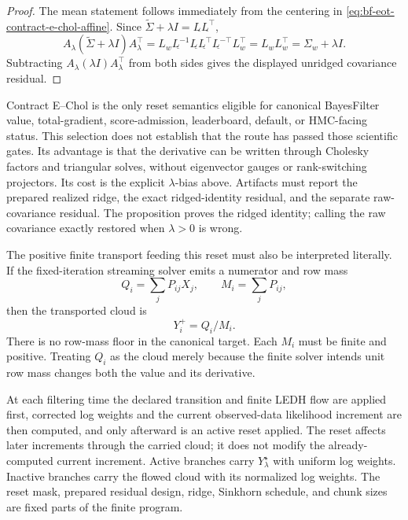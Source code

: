 \begin{proof}
The mean statement follows immediately from the centering in
\eqref{eq:bf-eot-contract-e-chol-affine}.  Since
\(\widetilde\Sigma+\lambda I=L_{\widetilde{}}L_{\widetilde{}}^\top\),
\[
  A_\lambda(\widetilde\Sigma+\lambda I)A_\lambda^\top
  =
  L_wL_{\widetilde{}}^{-1}
  L_{\widetilde{}}L_{\widetilde{}}^\top
  L_{\widetilde{}}^{-\top}L_w^\top
  =
  L_wL_w^\top
  =
  \Sigma_w+\lambda I.
\]
Subtracting
\(A_\lambda(\lambda I)A_\lambda^\top\) from both sides gives the displayed
unridged covariance residual.
\end{proof}

Contract E--Chol is the only reset semantics eligible for canonical BayesFilter
value, total-gradient, score-admission, leaderboard, default, or HMC-facing
status.  This selection does not establish that the route has passed those
scientific gates.  Its advantage is that the derivative can be written through
Cholesky factors and triangular solves, without eigenvector gauges or
rank-switching projectors.  Its cost is the explicit \(\lambda\)-bias above.
Artifacts must report the prepared realized ridge, the exact ridged-identity
residual, and the separate raw-covariance residual.  The proposition proves the
ridged identity; calling the raw covariance exactly restored when
\(\lambda>0\) is wrong.

The positive finite transport feeding this reset must also be interpreted
literally.  If the fixed-iteration streaming solver emits a numerator and row
mass
\[
  Q_i=\sum_j P_{ij}X_j,\qquad M_i=\sum_j P_{ij},
\]
then the transported cloud is
\begin{equation}
\label{eq:bf-eot-contract-e-row-quotient}
  Y_i^+=Q_i/M_i.
\end{equation}
There is no row-mass floor in the canonical target.  Each \(M_i\) must be finite
and positive.  Treating \(Q_i\) as the cloud merely because the finite solver
intends unit row mass changes both the value and its derivative.

At each filtering time the declared transition and finite LEDH flow are applied
first, corrected log weights and the current observed-data likelihood increment
are then computed, and only afterward is an active reset applied.  The reset
affects later increments through the carried cloud; it does not modify the
already-computed current increment.  Active branches carry
\(Y^\star_\lambda\) with uniform log weights.  Inactive branches carry the
flowed cloud with its normalized log weights.  The reset mask, prepared residual
design, ridge, Sinkhorn schedule, and chunk sizes are fixed parts of the finite
program.

